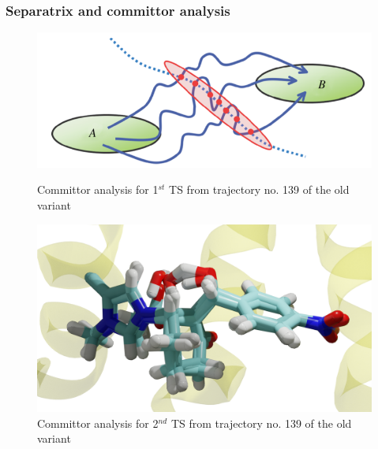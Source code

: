 \documentclass{beamer}
\begin{document}
\begin{frame}
\frametitle{Separatrix and committor analysis}
\begin{figure}[ht!]
\centering
\begin{minipage}[b]{0.45\linewidth}
\includegraphics[scale=0.2]{figures/separatrix-full.png}
\caption{Committor analysis for 1$^{st}$ TS from trajectory no. 139 of the old variant}
\label{fig:minipage1}
\end{minipage}
\quad
\begin{minipage}[b]{0.45\linewidth}
\includegraphics[scale=0.08]{figures/trans-ensemble.png}
\caption{Committor analysis for 2$^{nd}$ TS from trajectory no. 139 of the old variant}
\label{fig:minipage2}
\end{minipage}
\end{figure}
%
%
\end{frame}
\end{document}
